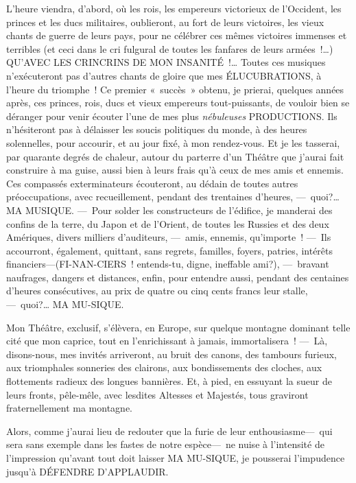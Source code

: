\documentclass[french,twoside]{book} %
\begin{document}
L’heure viendra, d’abord, où les rois, les empereurs victorieux de l’Occident, les princes et les ducs militaires, oublieront, au fort de leurs victoires, les vieux chants de guerre de leurs pays, pour ne célébrer ces mêmes victoires immenses et terribles (et ceci dans le cri fulgural de toutes les fanfares de leurs armées !…) QU’AVEC LES CRINCRINS DE MON INSANITÉ !… Toutes ces musiques n’exécuteront pas d’autres chants de gloire que mes ÉLUCUBRATIONS, à l’heure du triomphe ! Ce   premier « succès » obtenu, je prierai, quelques années après, ces princes, rois, ducs et vieux empereurs tout-puissants, de vouloir bien se déranger pour venir écouter l’une de mes plus \emph{nébuleuses} PRODUCTIONS. Ils n’hésiteront pas à délaisser les soucis politiques du monde, à des heures solennelles, pour accourir, et au jour fixé, à mon rendez-vous. Et je les tasserai, par quarante degrés de chaleur, autour du parterre d’un Théâtre que j’aurai fait construire à ma guise, aussi bien à leurs frais qu’à ceux de mes amis et ennemis. Ces compassés exterminateurs écouteront, au dédain de toutes autres préoccupations, avec recueillement, pendant des trentaines d’heures, — quoi?… MA MUSIQUE. — Pour solder les constructeurs de l’édifice, je manderai des confins de la terre, du Japon et de l’Orient, de toutes les Russies et des deux Amériques, divers milliers d’auditeurs, — amis, ennemis, qu’importe ! — Ils accourront, également, quittant, sans regrets, familles, foyers, patries, intérêts financiers—(FI-NAN-CIERS ! entends-tu, digne, ineffable ami?), — bravant naufrages,   dangers et distances, enfin, pour entendre aussi, pendant des centaines d’heures consécutives, au prix de quatre ou cinq cents francs leur stalle, — quoi?… MA MU-SIQUE.\par
Mon Théâtre, exclusif, s’élèvera, en Europe, sur quelque montagne dominant telle cité que mon caprice, tout en l’enrichissant à jamais, immortalisera ! — Là, disons-nous, mes invités arriveront, au bruit des canons, des tambours furieux, aux triomphales sonneries des clairons, aux bondissements des cloches, aux flottements radieux des longues bannières. Et, à pied, en essuyant la sueur de leurs fronts, pêle-mêle, avec lesdites Altesses et Majestés, tous graviront fraternellement ma montagne.\par
Alors, comme j’aurai lieu de redouter que la furie de leur enthousiasme— qui sera sans exemple dans les fastes de notre espèce— ne nuise à l’intensité de l’impression qu’avant tout doit laisser MA MU-SIQUE, je pousserai l’impudence jusqu’à DÉFENDRE D’APPLAUDIR.\par
\end{document}
